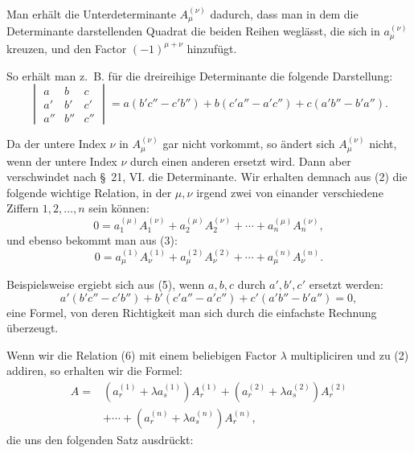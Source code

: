 \documentclass[11pt]{article}
\begin{document}
Man erhält die Unterdeterminante \(A_\mu^{(\nu)}\) dadurch, dass man in dem die Determinante darstellenden Quadrat die beiden Reihen weglässt, die sich in \(a_\mu^{(\nu)}\) kreuzen, und den Factor \((-1)^{\mu+\nu}\) hinzufügt.

So erhält man z.~B. für die dreireihige Determinante die folgende Darstellung:
\begin{equation}
\begin{vmatrix}
a&b&c\\
a'&b'&c'\\
a''&b''&c''
\end{vmatrix}
=a(b'c''-c'b'')+b(c'a''-a'c'')+c(a'b''-b'a'').
\tag{5}
\end{equation}

Da der untere Index \(\nu\) in \(A_\mu^{(\nu)}\) gar nicht vorkommt, so ändert sich \(A_\mu^{(\nu)}\) nicht, wenn der untere Index \(\nu\) durch einen anderen ersetzt wird. Dann aber verschwindet nach \S~21, VI. die Determinante. Wir erhalten demnach aus (2) die folgende wichtige Relation, in der \(\mu,\nu\) irgend zwei von einander verschiedene Ziffern \(1,2,\ldots,n\) sein können:
\begin{equation}
0=a_1^{(\mu)}A_1^{(\nu)}+a_2^{(\mu)}A_2^{(\nu)}+\cdots+a_n^{(\mu)}A_n^{(\nu)},
\tag{6}
\end{equation}
und ebenso bekommt man aus (3):
\begin{equation}
0=a_\mu^{(1)}A_\nu^{(1)}+a_\mu^{(2)}A_\nu^{(2)}+\cdots+a_\mu^{(n)}A_\nu^{(n)}.
\tag{7}
\end{equation}

Beispielsweise ergiebt sich aus (5), wenn \(a,b,c\) durch \(a',b',c'\) ersetzt werden:
\begin{equation}
a'(b'c''-c'b'')+b'(c'a''-a'c'')+c'(a'b''-b'a'')=0,
\tag{8}
\end{equation}
eine Formel, von deren Richtigkeit man sich durch die einfachste Rechnung überzeugt.

Wenn wir die Relation (6) mit einem beliebigen Factor \(\lambda\) multipliciren und zu (2) addiren, so erhalten wir die Formel:
\begin{equation}
\begin{aligned}
A={}&(a_r^{(1)}+\lambda a_s^{(1)})A_r^{(1)}
+(a_r^{(2)}+\lambda a_s^{(2)})A_r^{(2)}\\
&+\cdots+(a_r^{(n)}+\lambda a_s^{(n)})A_r^{(n)},
\end{aligned}
\tag{9}
\end{equation}
die uns den folgenden Satz ausdrückt:
\end{document}
